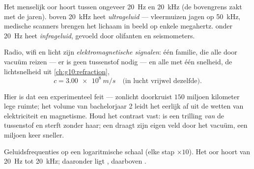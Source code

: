 \begin{definition}\label{def:g10:signals-and-waves:ultrasound}
Het menselijk oor hoort  tussen ongeveer \qty{20}{Hz} en
\qty{20}{kHz} (de bovengrens zakt met de jaren).  boven
\qty{20}{kHz} heet \emph{ultrageluid} --- vleermuizen
jagen op \qty{50}{kHz}, medische scanners brengen het lichaam in beeld op
enkele megahertz.  onder \qty{20}{Hz} heet
\emph{infrageluid}, gevoeld door olifanten en
seismometers.
\end{definition}

\begin{proposition}\label{prop:g10:signals-and-waves:em}
Radio, wifi en licht zijn \emph{elektromagnetische
signalen}: één familie, die alle door
vacuüm reizen --- er is geen tussenstof nodig --- en alle met één
snelheid, de lichtsnelheid uit \cref{ch:g10:refraction},
\[
c = \qty{3.00e8}{m/s} \quad \text{(in lucht vrijwel dezelfde).}
\]
\end{proposition}
\admitted

\begin{remark}\label{rem:g10:signals-and-waves:honest}
Hier is dat een experimenteel feit --- zonlicht doorkruist $150$ miljoen
kilometer lege ruimte; het volume van bachelorjaar 2 leidt het eerlijk af
uit de wetten van elektriciteit en magnetisme. Houd het contrast vast:
 is een trilling \emph{van} de tussenstof en sterft zonder haar;
een  draagt zijn eigen veld door het vacuüm, een
miljoen keer sneller.
\end{remark}

\begin{omfigure}

{\small Geluidsfrequenties op een logaritmische schaal (elke stap
$\times 10$). Het oor hoort van \qty{20}{Hz} tot \qty{20}{kHz}; daaronder
ligt , daarboven .}
\end{omfigure}

